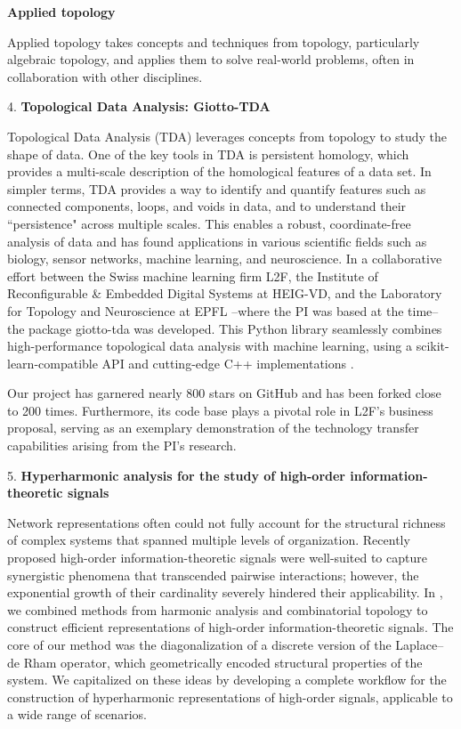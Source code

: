 \documentclass{amsart}
\begin{document}
	\textbf{Applied topology}

	Applied topology takes concepts and techniques from topology, particularly algebraic topology, and applies them to solve real-world problems, often in collaboration with other disciplines.

	4. \textbf{Topological Data Analysis: Giotto-TDA}

	Topological Data Analysis (TDA) leverages concepts from topology to study the shape of data. One of the key tools in TDA is persistent homology, which provides a multi-scale description of the homological features of a data set. In simpler terms, TDA provides a way to identify and quantify features such as connected components, loops, and voids in data, and to understand their ``persistence" across multiple scales. This enables a robust, coordinate-free analysis of data and has found applications in various scientific fields such as biology, sensor networks, machine learning, and neuroscience. In a collaborative effort between the Swiss machine learning firm L2F, the Institute of Reconfigurable \& Embedded Digital Systems at HEIG-VD, and the Laboratory for Topology and Neuroscience at EPFL --where the PI was based at the time-- the package giotto-tda was developed. This Python library seamlessly combines high-performance topological data analysis with machine learning, using a scikit-learn-compatible API and cutting-edge C++ implementations \cite{medina2021giotto}.

	Our project has garnered nearly 800 stars on GitHub and has been forked close to 200 times.
	Furthermore, its code base plays a pivotal role in L2F's business proposal, serving as an exemplary demonstration of the technology transfer capabilities arising from the PI's research.

	5. \textbf{Hyperharmonic analysis for the study of high-order information-theoretic signals}

	Network representations often could not fully account for the structural richness of complex systems that spanned multiple levels of organization. Recently proposed high-order information-theoretic signals were well-suited to capture synergistic phenomena that transcended pairwise interactions; however, the exponential growth of their cardinality severely hindered their applicability. In \cite{medina2021hyperharmonic}, we combined methods from harmonic analysis and combinatorial topology to construct efficient representations of high-order information-theoretic signals. The core of our method was the diagonalization of a discrete version of the Laplace–de Rham operator, which geometrically encoded structural properties of the system. We capitalized on these ideas by developing a complete workflow for the construction of hyperharmonic representations of high-order signals, applicable to a wide range of scenarios.
\end{document}
